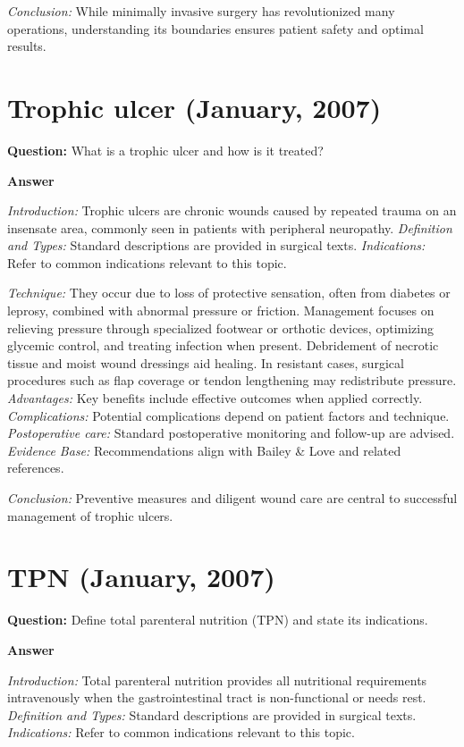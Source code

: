 \documentclass{article}
\begin{document}
\emph{Conclusion:} While minimally invasive surgery has revolutionized many operations, understanding its boundaries ensures patient safety and optimal results.


\section{Trophic ulcer (January, 2007)}

\textbf{Question:} What is a trophic ulcer and how is it treated?

\textbf{Answer}

\emph{Introduction:} Trophic ulcers are chronic wounds caused by repeated trauma on an insensate area, commonly seen in patients with peripheral neuropathy.
\emph{Definition and Types:} Standard descriptions are provided in surgical texts.
\emph{Indications:} Refer to common indications relevant to this topic.

\emph{Technique:} They occur due to loss of protective sensation, often from diabetes or leprosy, combined with abnormal pressure or friction. Management focuses on relieving pressure through specialized footwear or orthotic devices, optimizing glycemic control, and treating infection when present. Debridement of necrotic tissue and moist wound dressings aid healing. In resistant cases, surgical procedures such as flap coverage or tendon lengthening may redistribute pressure.
\emph{Advantages:} Key benefits include effective outcomes when applied correctly.
\emph{Complications:} Potential complications depend on patient factors and technique.
\emph{Postoperative care:} Standard postoperative monitoring and follow-up are advised.
\emph{Evidence Base:} Recommendations align with Bailey \& Love and related references.

\emph{Conclusion:} Preventive measures and diligent wound care are central to successful management of trophic ulcers.


\section{TPN (January, 2007)}

\textbf{Question:} Define total parenteral nutrition (TPN) and state its indications.

\textbf{Answer}

\emph{Introduction:} Total parenteral nutrition provides all nutritional requirements intravenously when the gastrointestinal tract is non-functional or needs rest.
\emph{Definition and Types:} Standard descriptions are provided in surgical texts.
\emph{Indications:} Refer to common indications relevant to this topic.
\end{document}
